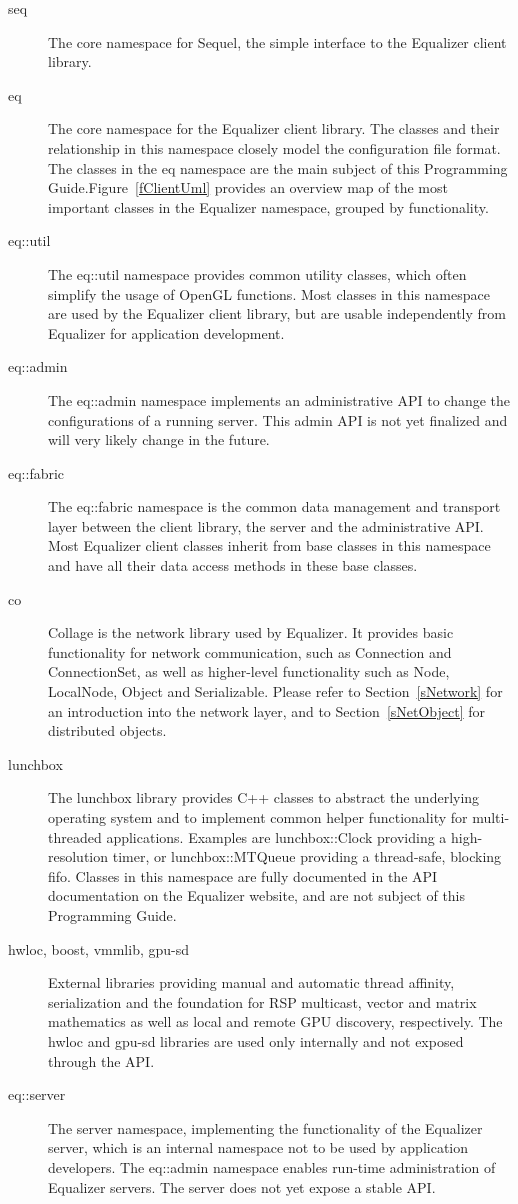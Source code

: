 \documentclass[10pt,a4]{scrartcl}
\newcommand{\fig}[1]{Figure~\ref{#1}}
\newcommand{\sref}[1]{Section~\ref{#1}}
\begin{document}
\begin{description}
\item[seq] The core namespace for Sequel, the simple interface to the Equalizer
  client library.
\item[eq] The core namespace for the Equalizer client library. The classes and
  their relationship in this namespace closely model the configuration file
  format. The classes in the \textsf{eq} namespace are the main subject of this
  Programming Guide.\fig{fClientUml} provides an overview map of the most
  important classes in the Equalizer namespace, grouped by functionality.
\item[eq::util] The eq::util namespace provides common utility classes, which
  often simplify the usage of OpenGL functions. Most classes in this namespace
  are used by the Equalizer client library, but are usable independently
  from Equalizer for application development.
\item[eq::admin] The eq::admin namespace implements an administrative API to
  change the configurations of a running server. This admin API is not yet
  finalized and will very likely change in the future.
\item[eq::fabric] The eq::fabric namespace is the common data management and
  transport layer between the client library, the server and the administrative
  API. Most Equalizer client classes inherit from base classes in this namespace
  and have all their data access methods in these base classes.
\item[co] Collage is the network library used by Equalizer. It provides basic
  functionality for network communication, such as \textsf{Connection} and
  \textsf{ConnectionSet}, as well as higher-level functionality such as
  \textsf{Node}, \textsf{LocalNode}, \textsf{Object} and
  \textsf{Serializable}. Please refer to \sref{sNetwork} for an introduction
  into the network layer, and to \sref{sNetObject} for distributed objects.
\item[lunchbox] The lunchbox library provides C++ classes to abstract the
  underlying operating system and to implement common helper functionality for
  multi-threaded applications. Examples are \textsf{lunchbox::Clock} providing a
  high-resolution timer, or \textsf{lunchbox::MTQueue} providing a thread-safe,
  blocking fifo. Classes in this namespace are fully documented in the API
  documentation on the Equalizer website, and are not subject of this
  Programming Guide.
\item[hwloc, boost, vmmlib, gpu-sd] External libraries providing manual and
  automatic thread affinity, serialization and the foundation for RSP multicast,
  vector and matrix mathematics as well as local and remote GPU discovery,
  respectively. The hwloc and gpu-sd libraries are used only internally and not
  exposed through the API.
\item[eq::server] The server namespace, implementing the functionality of the
  Equalizer server, which is an internal namespace not to be used by application
  developers. The \textsf{eq::admin} namespace enables run-time administration
  of Equalizer servers. The server does not yet expose a stable
  API.
\end{description}
\end{document}
